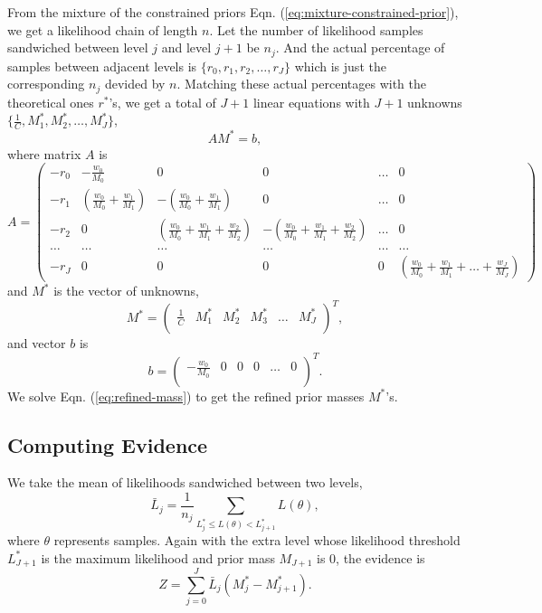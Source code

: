 \documentclass[letterpaper, preprint]{aastex}
\begin{document}
From the mixture of the constrained priors Eqn. (\ref{eq:mixture-constrained-prior}), we get a likelihood chain of length $n$. Let the number of likelihood samples sandwiched between level $j$ and level $j+1$ be $n_j$. And the actual percentage of samples between adjacent levels is $\{r_0,r_1,r_2,\dots,r_J\}$ which is just the corresponding $n_j$ devided by $n$. Matching these actual percentages with the theoretical ones $r^*$'s, we get a total of $J+1$ linear equations with $J+1$ unknowns $\{\frac{1}{C}, M^*_1,M^*_2,\ldots,M^*_J\}$,
\begin{equation}
A M^* = b,
\label{eq:refined-mass}
\end{equation}
where matrix $A$ is
\begin{equation}
A = 
\begin{pmatrix}
-r_0 & - \frac{w_0}{M_0} & 0 & 0 & \ldots & 0\\
-r_1 & \left(\frac{w_0}{M_0}+\frac{w_1}{M_1}\right) & -\left(\frac{w_0}{M_0}+\frac{w_1}{M_1}\right) & 0 & \ldots & 0\\
-r_2 & 0 &  \left(\frac{w_0}{M_0}+\frac{w_1}{M_1}+\frac{w_2}{M_2}\right) & -\left(\frac{w_0}{M_0}+\frac{w_1}{M_1}+\frac{w_2}{M_2}\right)  & \ldots & 0 \\
\ldots & \ldots &  \ldots & \ldots & \ldots & \ldots \\
-r_J & 0 & 0 & 0 & 0 &  \left(\frac{w_0}{M_0}+\frac{w_1}{M_1}+\dots+\frac{w_J}{M_J}\right) 
\end{pmatrix}
\end{equation}
and $M^*$ is the vector of unknowns,
\begin{equation}
M^* = 
\begin{pmatrix}
\frac{1}{C} & M^*_1 & M^*_2 & M^*_3 & \ldots & M^*_J\\
\end{pmatrix}^T,
\end{equation}
and vector $b$ is 
\begin{equation}
b = 
\begin{pmatrix}
-\frac{w_0}{M_0} & 0 & 0 & 0 & \ldots & 0\\
\end{pmatrix}^T.
\end{equation}
We solve Eqn. (\ref{eq:refined-mass}) to get the refined prior masses $M^*$'s.

\subsection{Computing Evidence}
We take the mean of likelihoods sandwiched between two levels,
\begin{equation}
\bar{L}_j= \frac{1}{n_j}\sum_{L_j^*\leq L(\theta)<L_{j+1}^*} L(\theta),
\end{equation}
where $\theta$ represents samples. Again with the extra level whose likelihood threshold $L^*_{J+1}$ is the maximum likelihood and prior mass $M_{J+1}$ is 0, the evidence is
\begin{equation}
Z = \sum_{j=0}^{J} \bar{L}_j (M^*_j - M^*_{j+1}).
\end{equation}
\end{document}
